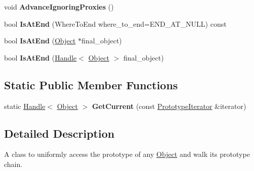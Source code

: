 \begin{DoxyCompactItemize}
\item 
\hypertarget{classv8_1_1internal_1_1_prototype_iterator_ab057cee4da776bc58be4bd5275a00e59}{}void {\bfseries Advance\+Ignoring\+Proxies} ()\label{classv8_1_1internal_1_1_prototype_iterator_ab057cee4da776bc58be4bd5275a00e59}

\item 
\hypertarget{classv8_1_1internal_1_1_prototype_iterator_a79780e045cd52b32403683cd776f5a45}{}bool {\bfseries Is\+At\+End} (Where\+To\+End where\+\_\+to\+\_\+end=E\+N\+D\+\_\+\+A\+T\+\_\+\+N\+U\+L\+L) const \label{classv8_1_1internal_1_1_prototype_iterator_a79780e045cd52b32403683cd776f5a45}

\item 
\hypertarget{classv8_1_1internal_1_1_prototype_iterator_a188dce0db6323dd27ff57d75630133c7}{}bool {\bfseries Is\+At\+End} (\hyperlink{classv8_1_1internal_1_1_object}{Object} $\ast$final\+\_\+object)\label{classv8_1_1internal_1_1_prototype_iterator_a188dce0db6323dd27ff57d75630133c7}

\item 
\hypertarget{classv8_1_1internal_1_1_prototype_iterator_ace2959191761cf8e1475bc14c6cb34ec}{}bool {\bfseries Is\+At\+End} (\hyperlink{classv8_1_1internal_1_1_handle}{Handle}$<$ \hyperlink{classv8_1_1internal_1_1_object}{Object} $>$ final\+\_\+object)\label{classv8_1_1internal_1_1_prototype_iterator_ace2959191761cf8e1475bc14c6cb34ec}

\end{DoxyCompactItemize}
\subsection*{Static Public Member Functions}
\begin{DoxyCompactItemize}
\item 
\hypertarget{classv8_1_1internal_1_1_prototype_iterator_a5844f82e8fdb0b633bca85f557466554}{}static \hyperlink{classv8_1_1internal_1_1_handle}{Handle}$<$ \hyperlink{classv8_1_1internal_1_1_object}{Object} $>$ {\bfseries Get\+Current} (const \hyperlink{classv8_1_1internal_1_1_prototype_iterator}{Prototype\+Iterator} \&iterator)\label{classv8_1_1internal_1_1_prototype_iterator_a5844f82e8fdb0b633bca85f557466554}

\end{DoxyCompactItemize}


\subsection{Detailed Description}
A class to uniformly access the prototype of any \hyperlink{classv8_1_1internal_1_1_object}{Object} and walk its prototype chain.

